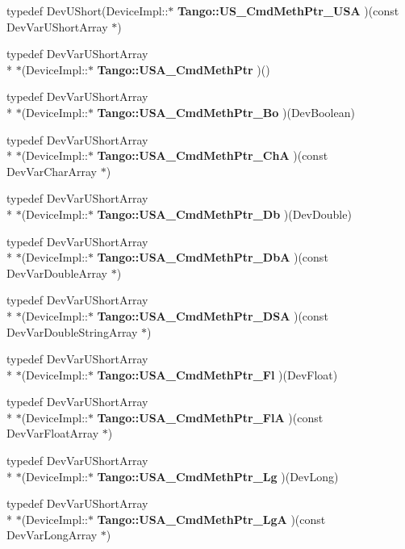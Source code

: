 \begin{DoxyCompactItemize}
\item 
typedef Dev\-U\-Short(Device\-Impl\-::$\ast$ {\bf Tango\-::\-U\-S\-\_\-\-Cmd\-Meth\-Ptr\-\_\-\-U\-S\-A} )(const Dev\-Var\-U\-Short\-Array $\ast$)
\item 
typedef Dev\-Var\-U\-Short\-Array \\*
$\ast$(Device\-Impl\-::$\ast$ {\bf Tango\-::\-U\-S\-A\-\_\-\-Cmd\-Meth\-Ptr} )()
\item 
typedef Dev\-Var\-U\-Short\-Array \\*
$\ast$(Device\-Impl\-::$\ast$ {\bf Tango\-::\-U\-S\-A\-\_\-\-Cmd\-Meth\-Ptr\-\_\-\-Bo} )(Dev\-Boolean)
\item 
typedef Dev\-Var\-U\-Short\-Array \\*
$\ast$(Device\-Impl\-::$\ast$ {\bf Tango\-::\-U\-S\-A\-\_\-\-Cmd\-Meth\-Ptr\-\_\-\-Ch\-A} )(const Dev\-Var\-Char\-Array $\ast$)
\item 
typedef Dev\-Var\-U\-Short\-Array \\*
$\ast$(Device\-Impl\-::$\ast$ {\bf Tango\-::\-U\-S\-A\-\_\-\-Cmd\-Meth\-Ptr\-\_\-\-Db} )(Dev\-Double)
\item 
typedef Dev\-Var\-U\-Short\-Array \\*
$\ast$(Device\-Impl\-::$\ast$ {\bf Tango\-::\-U\-S\-A\-\_\-\-Cmd\-Meth\-Ptr\-\_\-\-Db\-A} )(const Dev\-Var\-Double\-Array $\ast$)
\item 
typedef Dev\-Var\-U\-Short\-Array \\*
$\ast$(Device\-Impl\-::$\ast$ {\bf Tango\-::\-U\-S\-A\-\_\-\-Cmd\-Meth\-Ptr\-\_\-\-D\-S\-A} )(const Dev\-Var\-Double\-String\-Array $\ast$)
\item 
typedef Dev\-Var\-U\-Short\-Array \\*
$\ast$(Device\-Impl\-::$\ast$ {\bf Tango\-::\-U\-S\-A\-\_\-\-Cmd\-Meth\-Ptr\-\_\-\-Fl} )(Dev\-Float)
\item 
typedef Dev\-Var\-U\-Short\-Array \\*
$\ast$(Device\-Impl\-::$\ast$ {\bf Tango\-::\-U\-S\-A\-\_\-\-Cmd\-Meth\-Ptr\-\_\-\-Fl\-A} )(const Dev\-Var\-Float\-Array $\ast$)
\item 
typedef Dev\-Var\-U\-Short\-Array \\*
$\ast$(Device\-Impl\-::$\ast$ {\bf Tango\-::\-U\-S\-A\-\_\-\-Cmd\-Meth\-Ptr\-\_\-\-Lg} )(Dev\-Long)
\item 
typedef Dev\-Var\-U\-Short\-Array \\*
$\ast$(Device\-Impl\-::$\ast$ {\bf Tango\-::\-U\-S\-A\-\_\-\-Cmd\-Meth\-Ptr\-\_\-\-Lg\-A} )(const Dev\-Var\-Long\-Array $\ast$)
\item 

\end{DoxyCompactItemize}
